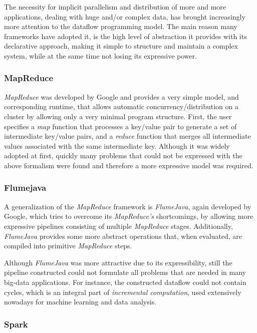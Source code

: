 \documentclass[sigplan,review,anonymous]{acmart}\settopmatter{printfolios=true}
\begin{document}
The necessity for implicit parallelism and distribution of more and more applications, dealing with huge and/or complex data, has brought increasingly more attention to the dataflow programming model. The main reason many frameworks have adopted it, is the high level of abstraction it provides with its declarative approach, making it simple to structure and maintain a complex system, while at the same time not losing its expressive power.

\subsubsection{MapReduce}

\textit{MapReduce} was developed by Google and provides a very simple model, and corresponding runtime, that allows automatic concurrency/distribution on a cluster by allowing only a very minimal program structure. First, the user specifies a \textit{map} function that processes a key/value pair to generate a set of intermediate key/value pairs, and a \textit{reduce} function that merges all intermediate values associated with the same intermediate key. Although it was widely adopted at first, quickly many problems that could not be expressed with the above formalism were found and therefore a more expressive model was required.

\subsubsection{Flumejava}

A generalization of the \textit{MapReduce} framework is \textit{FlumeJava}, again developed by Google, which tries to overcome its \textit{MapReduce's } shortcomings, by allowing more expressive pipelines consisting of multiple \textit{MapReduce} stages. Additionally, \textit{FlumeJava} provides some more abstract operations that, when evaluated, are compiled into primitive \textit{MapReduce} steps.

Although \textit{FlumeJava} was more attractive due to its expressibility, still the pipeline constructed could not formulate all problems that are needed in many big-data applications. For instance, the constructed dataflow could not contain cycles, which is an integral part of \textit{incremental computation}, used extensively nowadays for machine learning and data analysis.

\subsubsection{Spark}
\end{document}
